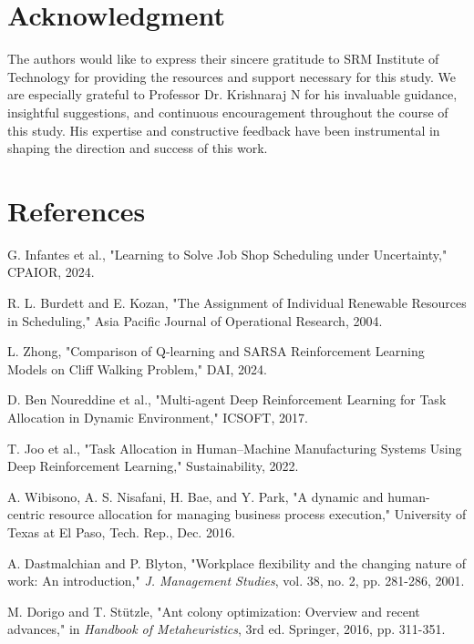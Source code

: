 \documentclass[conference]{IEEEtran}
\begin{document}
	\section*{Acknowledgment}
	The authors would like to express their sincere gratitude to SRM Institute of
	Technology for providing the resources and support necessary for this study. We
	are especially grateful to Professor Dr. Krishnaraj N for his invaluable
	guidance, insightful suggestions, and continuous encouragement throughout the
	course of this study. His expertise and constructive feedback have been instrumental
	in shaping the direction and success of this work.

	\section{References}
	\begin{thebibliography}{00}
		 G. Infantes et al., "Learning to Solve Job Shop Scheduling
			under Uncertainty," CPAIOR, 2024.

		 R. L. Burdett and E. Kozan, "The Assignment of
			Individual Renewable Resources in Scheduling," Asia Pacific Journal of
			Operational Research, 2004.

		 L. Zhong, "Comparison of Q-learning and SARSA
			Reinforcement Learning Models on Cliff Walking Problem," DAI, 2024.

		 D. Ben Noureddine et al., "Multi-agent Deep Reinforcement
			Learning for Task Allocation in Dynamic Environment," ICSOFT, 2017.

		 T. Joo et al., "Task Allocation in Human–Machine Manufacturing
			Systems Using Deep Reinforcement Learning," Sustainability, 2022.

		 A. Wibisono, A. S. Nisafani, H. Bae, and Y. Park, "A dynamic
			and human-centric resource allocation for managing business process execution,"
			University of Texas at El Paso, Tech. Rep., Dec. 2016.

		 A. Dastmalchian and P. Blyton, "Workplace flexibility
			and the changing nature of work: An introduction," \textit{J. Management Studies},
			vol. 38, no. 2, pp. 281-286, 2001.

		 M. Dorigo and T. Stützle, "Ant colony optimization:
			Overview and recent advances," in \textit{Handbook of Metaheuristics}, 3rd
			ed. Springer, 2016, pp. 311-351.
	\end{thebibliography}
	\vspace{12pt}
\end{document}
